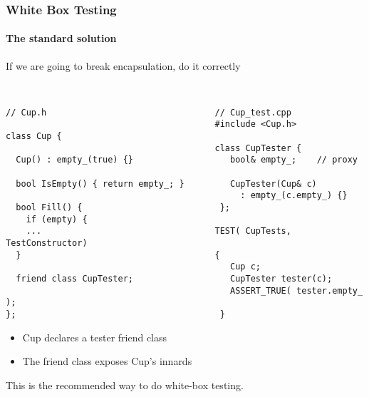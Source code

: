\begin{frame}[fragile,t]
\frametitle{White Box Testing}
\framesubtitle {The standard solution}
If we are going to break encapsulation, do it correctly
{\scriptsize\
\begin{verbatim}
// Cup.h                                 // Cup_test.cpp
                                         #include <Cup.h>
class Cup {                              
                                         class CupTester {
  Cup() : empty_(true) {}                   bool& empty_;    // proxy 
                                            
  bool IsEmpty() { return empty_; }         CupTester(Cup& c) 
                                              : empty_(c.empty_) {}
  bool Fill() {                           };  
    if (empty) {                         
    ...                                  TEST( CupTests, TestConstructor)     
  }                                      {                                    
                                            Cup c;                            
  friend class CupTester;                   CupTester tester(c);
                                            ASSERT_TRUE( tester.empty_ ); 
};                                        }
\end{verbatim}}
\begin{itemize}
\item Cup declares a tester friend class
\item The friend class exposes Cup's innards
\end{itemize}
This is the recommended way to do white-box testing.
\end{frame}


